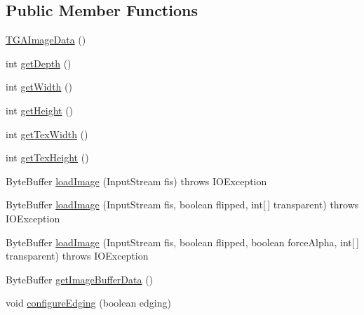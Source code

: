 \subsection*{Public Member Functions}
\begin{DoxyCompactItemize}
\item 
\mbox{\hyperlink{classorg_1_1newdawn_1_1slick_1_1opengl_1_1_t_g_a_image_data_a8fb7fd4d1276b068e3fec160d12a1059}{T\+G\+A\+Image\+Data}} ()
\item 
int \mbox{\hyperlink{classorg_1_1newdawn_1_1slick_1_1opengl_1_1_t_g_a_image_data_abcda568d9272d044fe65b2bba9905731}{get\+Depth}} ()
\item 
int \mbox{\hyperlink{classorg_1_1newdawn_1_1slick_1_1opengl_1_1_t_g_a_image_data_af1fc952e1578b431cfc2662387d9e38c}{get\+Width}} ()
\item 
int \mbox{\hyperlink{classorg_1_1newdawn_1_1slick_1_1opengl_1_1_t_g_a_image_data_a8c2eee4a09c160a0f4fbe6f49db7b888}{get\+Height}} ()
\item 
int \mbox{\hyperlink{classorg_1_1newdawn_1_1slick_1_1opengl_1_1_t_g_a_image_data_a4e4b19e2ec7982442fc5086cbf7f3a30}{get\+Tex\+Width}} ()
\item 
int \mbox{\hyperlink{classorg_1_1newdawn_1_1slick_1_1opengl_1_1_t_g_a_image_data_a787a45da7ec0d249ff4ab5db7784d535}{get\+Tex\+Height}} ()
\item 
Byte\+Buffer \mbox{\hyperlink{classorg_1_1newdawn_1_1slick_1_1opengl_1_1_t_g_a_image_data_a9ac907fe85767aad15fa1c05af8fb093}{load\+Image}} (Input\+Stream fis)  throws I\+O\+Exception 
\item 
Byte\+Buffer \mbox{\hyperlink{classorg_1_1newdawn_1_1slick_1_1opengl_1_1_t_g_a_image_data_afeb723edb941a99d15296d28b4404c31}{load\+Image}} (Input\+Stream fis, boolean flipped, int\mbox{[}$\,$\mbox{]} transparent)  throws I\+O\+Exception 
\item 
Byte\+Buffer \mbox{\hyperlink{classorg_1_1newdawn_1_1slick_1_1opengl_1_1_t_g_a_image_data_a45d077de182a890729f2e9cf9e408520}{load\+Image}} (Input\+Stream fis, boolean flipped, boolean force\+Alpha, int\mbox{[}$\,$\mbox{]} transparent)  throws I\+O\+Exception 
\item 
Byte\+Buffer \mbox{\hyperlink{classorg_1_1newdawn_1_1slick_1_1opengl_1_1_t_g_a_image_data_a282c69bf240178ff35cb72f91496ba3c}{get\+Image\+Buffer\+Data}} ()
\item 
void \mbox{\hyperlink{classorg_1_1newdawn_1_1slick_1_1opengl_1_1_t_g_a_image_data_a05f274a1f466b4a58192c99d1c500535}{configure\+Edging}} (boolean edging)
\end{DoxyCompactItemize}
